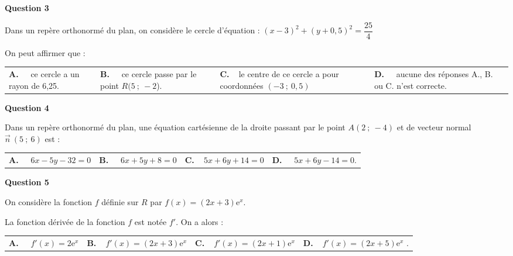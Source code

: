 \documentclass[10pt]{article}
\providecommand{\vv}[1]{\overrightarrow{#1}}
\providecommand{\e}{{\mathrm{e}}}
\providecommand{\vv}[1]{{\overrightarrow{#1}}}
\begin{document}
\textbf{Question 3}

\medskip 

Dans un repère orthonormé du plan, on considère le cercle d'équation :
$(x-3)^2 + (y+ 0,5)^2 = \dfrac{25}{4}$

On peut affirmer que :

\medskip

\begin{tabularx}{\linewidth}{*{4}{X}}
\textbf{A.~~} ce cercle a un rayon
de 6,25. &\textbf{B.~~} ce cercle passe par
le point $R(5~;~-2$).&\textbf{C.~~}le centre de ce cercle a pour
coordonnées $(-3~;~0,5)$& \textbf{D.~~} aucune des réponses A., B. ou C. n'est
correcte.
\end{tabularx}

\medskip

\textbf{Question 4}

\medskip 

Dans un repère orthonormé du plan, une équation cartésienne de la droite passant par le
point $A(2~;~-4)$ et de vecteur normal $\vv{n} \ (5~;~6)$ est :

\medskip

\begin{tabularx}{\linewidth}{*{4}{X}}
\textbf{A.~~} $6x -5y - 32 = 0$ &\textbf{B.~~} $6x + 5y + 8 = 0
$&\textbf{C.~~}$5x+ 6y + 14 = 0$& \textbf{D.~~} $5x + 6y - 14 = 0$.
\end{tabularx}

\medskip

\textbf{Question 5}

\medskip 

On considère la fonction $f$ définie sur $R$ par $f(x) = (2x + 3)\e^x$.

La fonction dérivée de la fonction $f$ est notée $f'$. On a alors :

\medskip

\begin{tabularx}{\linewidth}{*{4}{X}}
\textbf{A.~~} $f'(x) = 2\e^x$ &\textbf{B.~~}$f'(x) = (2x + 3)\e^x$
 &\textbf{C.~~}$f'(x) = (2x + 1)\e^x$& \textbf{D.~~}$f'(x) = (2x + 5)\e^x$ .
\end{tabularx}

\vspace{0,5cm}
\end{document}
